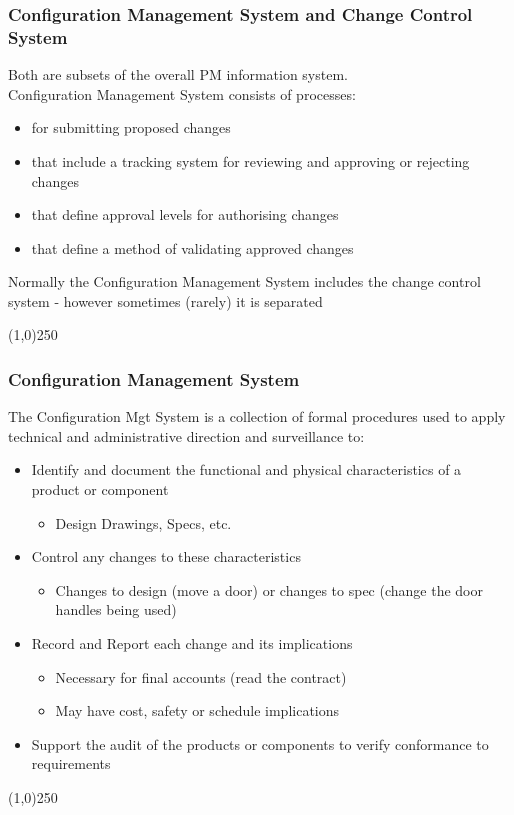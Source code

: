 \begin{frame}
\frametitle{Configuration Management System and Change Control System}
Both are subsets of the overall PM information system.\\
Configuration Management System consists of processes:\\ 
\begin{itemize}
	\item for  submitting proposed changes
	\item that include a tracking system for reviewing and approving or rejecting changes
	\item that define approval levels for authorising changes
	\item that define a method of validating approved changes
\end{itemize}
Normally the Configuration Management System includes the change control system - however sometimes (rarely) it is separated
\end{frame}\begin{center}\line(1,0){250}\end{center}
%
%



\begin{frame}
\frametitle{Configuration Management System}
The Configuration Mgt System is a collection of formal procedures used to apply technical and administrative direction and surveillance to:
\begin{itemize}
	\item Identify and document the functional and physical characteristics of a product or component 
		\begin{itemize}
			\item Design Drawings, Specs, etc.
		\end{itemize}
	\item Control any changes to these characteristics
		\begin{itemize}
			\item Changes to design (move a door) or changes to spec (change the door handles being used)
		\end{itemize}
	\item Record and Report each change and its implications
		\begin{itemize}
			\item Necessary for final accounts (read the contract)
			\item May have cost, safety or schedule implications
		\end{itemize}
	\item Support the audit of the products or components to verify conformance to requirements
\end{itemize}
\end{frame}\begin{center}\line(1,0){250}\end{center}
%
%

